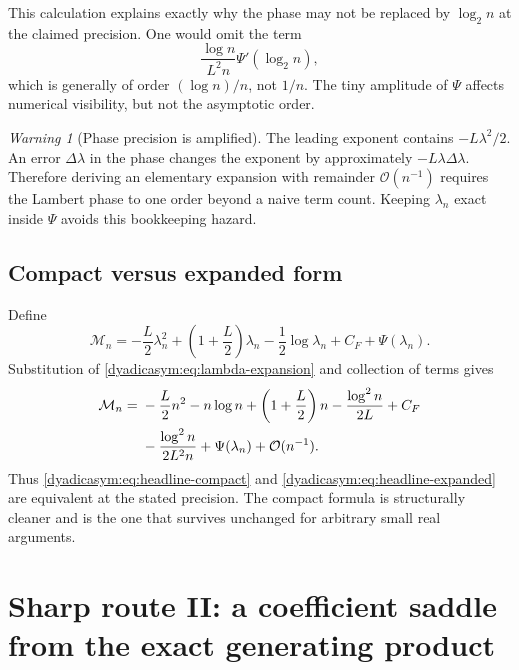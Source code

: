 \documentclass[11pt,oneside]{article}
\theoremstyle{definition}
\theoremstyle{remark}
\newtheorem{warning}[warning]{Warning}
\newcommand{\bigO}{\mathcal O}
\begin{document}
This calculation explains exactly why the phase may not be replaced by $\log_2n$ at the
claimed precision.  One would omit the term
\begin{equation}
 \frac{\log n}{L^2n}\Psi'(\log_2n),                         \label{dyadicasym:eq:missing-phase-term}
\end{equation}
which is generally of order $(\log n)/n$, not $1/n$.  The tiny amplitude of $\Psi$ affects
numerical visibility, but not the asymptotic order.

\begin{warning}[Phase precision is amplified]
The leading exponent contains $-L\lambda^2/2$.  An error $\Delta\lambda$ in the phase changes
the exponent by approximately $-L\lambda\Delta\lambda$.  Therefore deriving an elementary
expansion with remainder $\bigO(n^{-1})$ requires the Lambert phase to one order beyond a
naive term count.  Keeping $\lambda_n$ exact inside $\Psi$ avoids this bookkeeping hazard.
\end{warning}

\subsection{Compact versus expanded form}

Define
\begin{equation}
 \mathcal M_n=-\frac L2\lambda_n^2+
 \left(1+\frac L2\right)\lambda_n-\frac12\log\lambda_n
 +C_F+\Psi(\lambda_n).                                     \label{dyadicasym:eq:Mn}
\end{equation}
Substitution of \eqref{dyadicasym:eq:lambda-expansion} and collection of terms gives
\begin{align}
 \mathcal M_n={}&-\frac L2n^2-n\log n+
 \left(1+\frac L2\right)n-\frac{\log^2n}{2L}+C_F           \notag\\
 &-\frac{\log^2n}{2L^2n}+\Psi(\lambda_n)+\bigO(n^{-1}).   \label{dyadicasym:eq:compact-to-expanded}
\end{align}
Thus \eqref{dyadicasym:eq:headline-compact} and \eqref{dyadicasym:eq:headline-expanded} are equivalent at the stated
precision.  The compact formula is structurally cleaner and is the one that survives
unchanged for arbitrary small real arguments.

\section{Sharp route II: a coefficient saddle from the exact generating product}
\label{dyadicasym:sec:coefficient-saddle}
\end{document}
